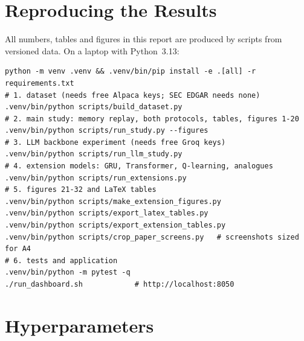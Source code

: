 \chapter{Reproducing the Results}
\label{app:repro}

All numbers, tables and figures in this report are produced by scripts from versioned data. On a laptop with Python~3.13:

\begin{verbatim}
python -m venv .venv && .venv/bin/pip install -e .[all] -r requirements.txt
# 1. dataset (needs free Alpaca keys; SEC EDGAR needs none)
.venv/bin/python scripts/build_dataset.py
# 2. main study: memory replay, both protocols, tables, figures 1-20
.venv/bin/python scripts/run_study.py --figures
# 3. LLM backbone experiment (needs free Groq keys)
.venv/bin/python scripts/run_llm_study.py
# 4. extension models: GRU, Transformer, Q-learning, analogues
.venv/bin/python scripts/run_extensions.py
# 5. figures 21-32 and LaTeX tables
.venv/bin/python scripts/make_extension_figures.py
.venv/bin/python scripts/export_latex_tables.py
.venv/bin/python scripts/export_extension_tables.py
.venv/bin/python scripts/crop_paper_screens.py   # screenshots sized for A4
# 6. tests and application
.venv/bin/python -m pytest -q
./run_dashboard.sh            # http://localhost:8050
\end{verbatim}

\chapter{Hyperparameters}
\label{app:hyper}

